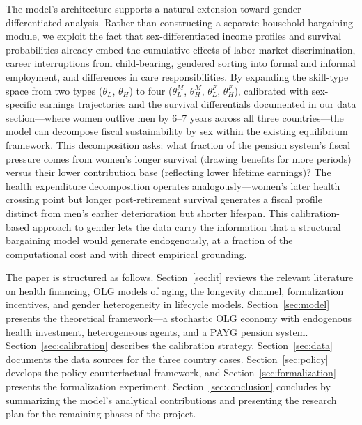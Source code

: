 \documentclass[12pt,a4paper]{article}
\begin{document}
The model's architecture supports a natural extension toward gender-differentiated analysis. Rather than constructing a separate household bargaining module, we exploit the fact that sex-differentiated income profiles and survival probabilities already embed the cumulative effects of labor market discrimination, career interruptions from child-bearing, gendered sorting into formal and informal employment, and differences in care responsibilities. By expanding the skill-type space from two types ($\theta_L$, $\theta_H$) to four ($\theta_L^M$, $\theta_H^M$, $\theta_L^F$, $\theta_H^F$), calibrated with sex-specific earnings trajectories and the survival differentials documented in our data section---where women outlive men by 6--7 years across all three countries---the model can decompose fiscal sustainability by sex within the existing equilibrium framework. This decomposition asks: what fraction of the pension system's fiscal pressure comes from women's longer survival (drawing benefits for more periods) versus their lower contribution base (reflecting lower lifetime earnings)? The health expenditure decomposition operates analogously---women's later health crossing point but longer post-retirement survival generates a fiscal profile distinct from men's earlier deterioration but shorter lifespan. This calibration-based approach to gender lets the data carry the information that a structural bargaining model would generate endogenously, at a fraction of the computational cost and with direct empirical grounding.

The paper is structured as follows. Section~\ref{sec:lit} reviews the relevant literature on health financing, OLG models of aging, the longevity channel, formalization incentives, and gender heterogeneity in lifecycle models. Section~\ref{sec:model} presents the theoretical framework---a stochastic OLG economy with endogenous health investment, heterogeneous agents, and a PAYG pension system. Section~\ref{sec:calibration} describes the calibration strategy. Section~\ref{sec:data} documents the data sources for the three country cases. Section~\ref{sec:policy} develops the policy counterfactual framework, and Section~\ref{sec:formalization} presents the formalization experiment. Section~\ref{sec:conclusion} concludes by summarizing the model's analytical contributions and presenting the research plan for the remaining phases of the project.

\end{document}
